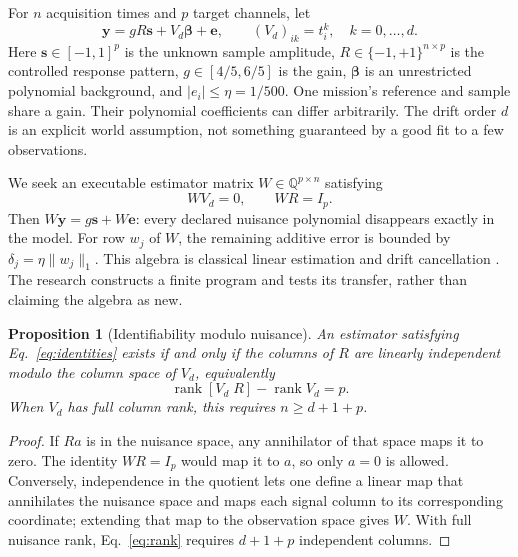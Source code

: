 \documentclass[11pt]{article}
\newtheorem{proposition}{Proposition}
\begin{document}
For $n$ acquisition times and $p$ target channels, let
\begin{equation}
\mathbf y=gR\mathbf s+V_d\boldsymbol\beta+\mathbf e,
\qquad (V_d)_{ik}=t_i^k,\quad k=0,\ldots,d.
\label{eq:world}
\end{equation}
Here $\mathbf s\in[-1,1]^p$ is the unknown sample amplitude, $R\in\{-1,+1\}^{n\times p}$ is the controlled response pattern, $g\in[4/5,6/5]$ is the gain, $\boldsymbol\beta$ is an unrestricted polynomial background, and $|e_i|\leq\eta=1/500$. One mission's reference and sample share a gain. Their polynomial coefficients can differ arbitrarily. The drift order $d$ is an explicit world assumption, not something guaranteed by a good fit to a few observations.

We seek an executable estimator matrix $W\in\mathbb Q^{p\times n}$ satisfying
\begin{equation}
WV_d=0,\qquad WR=I_p.
\label{eq:identities}
\end{equation}
Then $W\mathbf y=g\mathbf s+W\mathbf e$: every declared nuisance polynomial disappears exactly in the model. For row $w_j$ of $W$, the remaining additive error is bounded by $\delta_j=\eta\|w_j\|_1$. This algebra is classical linear estimation and drift cancellation \cite{doiron,swanson}. The research constructs a finite program and tests its transfer, rather than claiming the algebra as new.

\begin{proposition}[Identifiability modulo nuisance]
An estimator satisfying Eq.~\eqref{eq:identities} exists if and only if the columns of $R$ are linearly independent modulo the column space of $V_d$, equivalently
\begin{equation}
\operatorname{rank}[V_d\;R]-\operatorname{rank}V_d=p.
\label{eq:rank}
\end{equation}
When $V_d$ has full column rank, this requires $n\geq d+1+p$.
\end{proposition}
\begin{proof}
If $Ra$ is in the nuisance space, any annihilator of that space maps it to zero. The identity $WR=I_p$ would map it to $a$, so only $a=0$ is allowed. Conversely, independence in the quotient lets one define a linear map that annihilates the nuisance space and maps each signal column to its corresponding coordinate; extending that map to the observation space gives $W$. With full nuisance rank, Eq.~\eqref{eq:rank} requires $d+1+p$ independent columns.
\end{proof}
\end{document}
